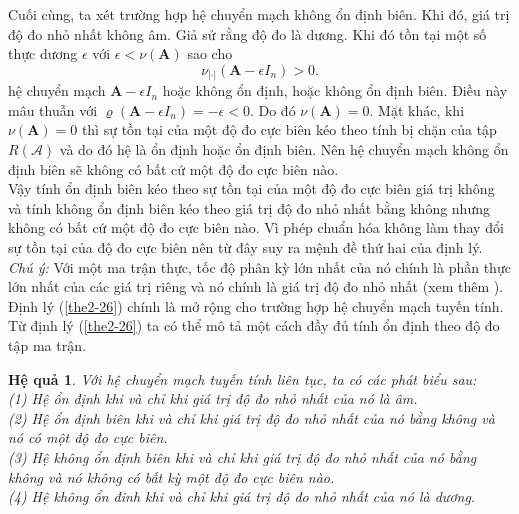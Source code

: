\documentclass[14pt,a4paper,oneside]{report}		%
\newtheorem{corollary}[theorem]{Hệ quả}
\theoremstyle{definition}
\begin{document}
Cuối cùng, ta xét trường hợp hệ chuyển mạch không ổn định biên. Khi đó, giá trị độ đo nhỏ nhất không âm. Giả sử rằng độ đo là dương. Khi đó tồn tại một số thực dương $\epsilon$ với $\epsilon <\nu(\mathbf{A})$ sao cho
$$\nu_{|\cdot|}(\mathbf{A}-\epsilon I_n)>0.$$
hệ chuyển mạch $\mathbf{A}-\epsilon I_n$ hoặc không ổn định, hoặc không ổn định biên. Điều này mâu thuẫn với $\varrho(\mathbf{A}-\epsilon I_n)=-\epsilon <0$. Do đó $\nu(\mathbf{A})=0$. Mặt khác, khi $\nu(\mathbf{A})=0$ thì sự tồn tại của một độ đo cực biên kéo theo tính bị chặn của tập $R(\mathcal{A})$ và do đó hệ là ổn định hoặc ổn định biên. Nên hệ chuyển mạch không ổn định biên sẽ không có bất cứ một độ đo cực biên nào.\\

Vậy tính ổn định biên kéo theo sự tồn tại của một độ đo cực biên giá trị không và tính không ổn định biên kéo theo giá trị độ đo nhỏ nhất bằng không nhưng không có bất cứ một độ đo cực biên nào. Vì phép chuẩn hóa không làm thay đổi sự tồn tại của độ đo cực biên nên từ đây suy ra mệnh đề thứ hai của định lý.\\

\textit{Chú ý:} Với một ma trận thực, tốc độ phân kỳ lớn nhất của nó chính là phần thực lớn nhất của các giá trị riêng và nó chính là giá trị độ đo nhỏ nhất (xem thêm \cite{DATN4}). Định lý (\ref{the2-26}) chính là mở rộng cho trường hợp hệ chuyển mạch tuyến tính.\\

Từ định lý (\ref{the2-26}) ta có thể mô tả một cách đầy đủ tính ổn định theo độ đo tập ma trận.

\begin{corollary} \label{co2-29}
Với hệ chuyển mạch tuyến tính liên tục, ta có các phát biểu sau:\\
(1) Hệ ổn định khi và chỉ khi giá trị độ đo nhỏ nhất của nó là âm.\\
(2) Hệ ổn định biên khi và chỉ khi giá trị độ đo nhỏ nhất của nó bằng không và nó có một độ đo cực biên.\\
(3) Hệ không ổn định biên khi và chỉ khi giá trị độ đo nhỏ nhất của nó bằng không và nó không có bất kỳ một độ đo cực biên nào.\\
(4) Hệ không ổn đinh khi và chỉ khi giá trị độ đo nhỏ nhất của nó là dương.
\end{corollary}
\end{document}

